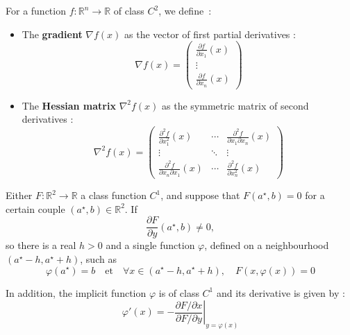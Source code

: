 \begin{f}
	For a function \( f : \mathbb{R}^n \rightarrow \mathbb{R} \) of class \( C^2 \), we define :
	
	\begin{itemize}
		\item The \textbf{gradient} \( \nabla f(x) \) as the vector of first partial derivatives :
		\[
		\nabla f(x) = 
		\begin{pmatrix}
			\frac{\partial f}{\partial x_1}(x) \\
			\vdots \\
			\frac{\partial f}{\partial x_n}(x)
		\end{pmatrix}
		\]
		
		\item The \textbf{Hessian matrix} \( \nabla^2 f(x) \) as the symmetric matrix of second derivatives :
		\[
		\nabla^2 f(x) =
		\begin{pmatrix}
			\frac{\partial^2 f}{\partial x_1^2}(x) & \cdots & \frac{\partial^2 f}{\partial x_1 \partial x_n}(x) \\
			\vdots & \ddots & \vdots \\
			\frac{\partial^2 f}{\partial x_n \partial x_1}(x) & \cdots & \frac{\partial^2 f}{\partial x_n^2}(x)
		\end{pmatrix}
		\]
	\end{itemize}
	
\end{f}

\begin{f}
	Either \( F : \mathbb{R}^2 \rightarrow \mathbb{R} \) a class function \( C^1 \), and suppose that \( F(a^\star, b) = 0 \) for a certain couple \( (a^\star, b) \in \mathbb{R}^2 \). If
	\[
	\frac{\partial F}{\partial y}(a^\star, b) \neq 0,
	\]
	so there is a real \( h > 0 \) and a single function \( \varphi \), defined on a neighbourhood \( (a^\star - h, a^\star + h) \), such as
	\[
	\varphi(a^\star) = b \quad \text{et} \quad \forall x \in (a^\star - h, a^\star + h), \quad F(x, \varphi(x)) = 0
	\]
	
	In addition, the implicit function \( \varphi \) is of class \( C^1 \) and its derivative is given by :
	\[
	\varphi'(x) = - \left. \frac{\partial F / \partial x}{\partial F / \partial y} \right|_{y = \varphi(x)}
	\]
	

\end{f}
